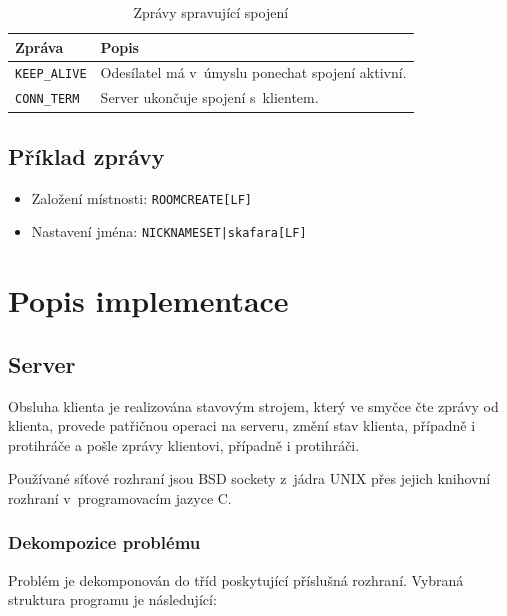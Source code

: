 \documentclass[a4paper, 12pt]{report}
\begin{document}
\begin{table}[]
\begin{center}
\caption{\label{tab:retain-connection}Zprávy spravující spojení}
\begin{tabular}{|l|l|}
\hline
\textbf{Zpráva} & \textbf{Popis} \\ \hline
\texttt{KEEP\_ALIVE} & Odesílatel má v~úmyslu ponechat spojení aktivní. \\ \hline
\texttt{CONN\_TERM}  & Server ukončuje spojení s~klientem.              \\ \hline
\end{tabular}
\end{center}
\end{table}

\section{Příklad zprávy}

\begin{itemize}
    \item Založení místnosti: \texttt{ROOM\textunderscore CREATE[LF]}
    \item Nastavení jména: \texttt{NICKNAME\textunderscore SET\texttt{|}skafara[LF]}
\end{itemize}

\chapter{Popis implementace}

\section{Server}

Obsluha klienta je realizována stavovým strojem, který ve smyčce čte zprávy od klienta, provede patřičnou operaci na serveru, změní stav klienta, případně i protihráče a pošle zprávy klientovi, případně i protihráči.

Používané síťové rozhraní jsou BSD sockety z~jádra UNIX přes jejich knihovní rozhraní v~programovacím jazyce C.

\subsection{Dekompozice problému}

Problém je dekomponován do tříd poskytující příslušná rozhraní. Vybraná struktura programu je následující:
\end{document}
